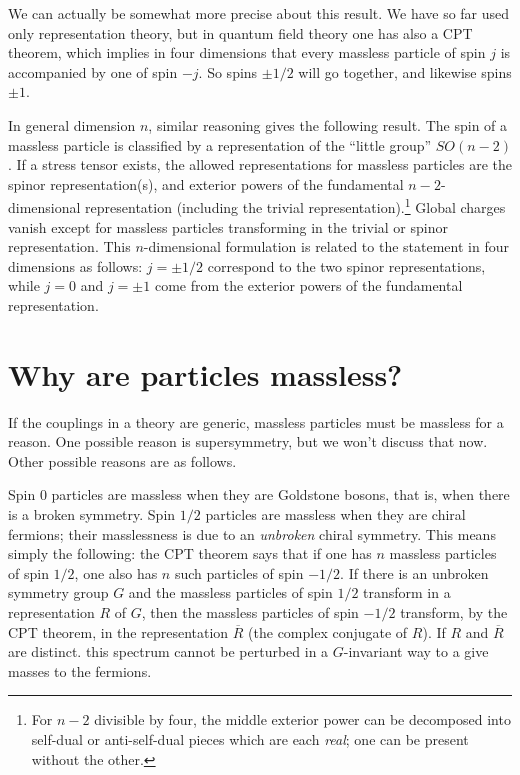 We can actually be somewhat more precise about this result.
  We have so far used only representation
theory, but in quantum field theory one has also a CPT theorem, which
implies in four dimensions
 that every massless particle of spin $j$ is accompanied by one of
spin $-j$.  So spins $\pm 1/2$ will go together, and likewise spins $\pm 1$.

In general dimension $n$, similar reasoning gives the following
result.  The spin of a massless particle is classified by
a representation of the ``little group''  $SO(n-2)$.  If a stress
tensor exists, the allowed
representations  for massless particles are
 the 
spinor representation(s), and exterior powers of the fundamental
$n-2$-dimensional
representation (including the trivial representation).\footnote{
For $n-2$ divisible by four, the middle exterior power can
be decomposed into self-dual or anti-self-dual pieces which are each
{\it real}; one can be present without the other.}
Global charges vanish except for massless particles transforming in the trivial
or spinor representation.
This $n$-dimensional
 formulation is related to the statement in four dimensions
as follows: $j=\pm 1/2$ correspond to the two spinor representations,
while $j=0$ and $j=\pm 1$ come from the exterior powers of the fundamental
representation.


\section{Why are particles massless?}

If the couplings in a theory are generic, massless particles must be massless
for a reason.  One possible reason is supersymmetry, but we won't discuss that
now.  Other possible reasons 
are as follows.

Spin $0$ particles are massless when they are Goldstone bosons, that is, when
there is a broken symmetry.  Spin $1/2$ particles are massless when they are
chiral fermions; their masslessness is due to an {\it unbroken}\/ chiral
symmetry.  This means simply the following:
the CPT theorem says that if one has $n$ massless particles of spin $1/2$,
one also has $n$ such particles of spin $-1/2$.  If there is an
unbroken
symmetry group $G$ and the massless particles of spin $1/2$ transform
in a representation $R$ of $G$, then the massless particles of spin $-1/2$
transform, by the CPT theorem, in the representation $\overline R$ (the
complex  conjugate of $R$).  If $R$ and $\overline R$ are distinct.
this spectrum cannot be perturbed in a $G$-invariant way to a give
masses to the fermions.

